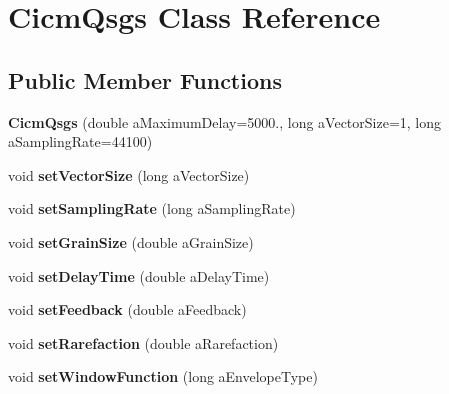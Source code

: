 \hypertarget{class_cicm_qsgs}{\section{Cicm\-Qsgs Class Reference}
\label{class_cicm_qsgs}
}
\subsection*{Public Member Functions}
\begin{DoxyCompactItemize}
\item 
\hypertarget{class_cicm_qsgs_a91938da8f569f5f09c833c98ba25587a}{{\bfseries Cicm\-Qsgs} (double a\-Maximum\-Delay=5000., long a\-Vector\-Size=1, long a\-Sampling\-Rate=44100)}\label{class_cicm_qsgs_a91938da8f569f5f09c833c98ba25587a}

\item 
\hypertarget{class_cicm_qsgs_a1061794e8dda2b3697948ccfdc0995c8}{void {\bfseries set\-Vector\-Size} (long a\-Vector\-Size)}\label{class_cicm_qsgs_a1061794e8dda2b3697948ccfdc0995c8}

\item 
\hypertarget{class_cicm_qsgs_aefd4f65a487f0db8d4986e76edd8faf3}{void {\bfseries set\-Sampling\-Rate} (long a\-Sampling\-Rate)}\label{class_cicm_qsgs_aefd4f65a487f0db8d4986e76edd8faf3}

\item 
\hypertarget{class_cicm_qsgs_a22b7d66f92661c9d1060f3bd272173c2}{void {\bfseries set\-Grain\-Size} (double a\-Grain\-Size)}\label{class_cicm_qsgs_a22b7d66f92661c9d1060f3bd272173c2}

\item 
\hypertarget{class_cicm_qsgs_a0cdcf9b54fac5f4c8bdc12a9b28f2472}{void {\bfseries set\-Delay\-Time} (double a\-Delay\-Time)}\label{class_cicm_qsgs_a0cdcf9b54fac5f4c8bdc12a9b28f2472}

\item 
\hypertarget{class_cicm_qsgs_a76a57db026d6306e15afb5e61e8f3de2}{void {\bfseries set\-Feedback} (double a\-Feedback)}\label{class_cicm_qsgs_a76a57db026d6306e15afb5e61e8f3de2}

\item 
\hypertarget{class_cicm_qsgs_a28f0edebe5a5c05f0a8d1720de8ad45e}{void {\bfseries set\-Rarefaction} (double a\-Rarefaction)}\label{class_cicm_qsgs_a28f0edebe5a5c05f0a8d1720de8ad45e}

\item 
\hypertarget{class_cicm_qsgs_a7f8af4826e5ea0b1b763870000479655}{void {\bfseries set\-Window\-Function} (long a\-Envelope\-Type)}\label{class_cicm_qsgs_a7f8af4826e5ea0b1b763870000479655}


\end{DoxyCompactItemize}
